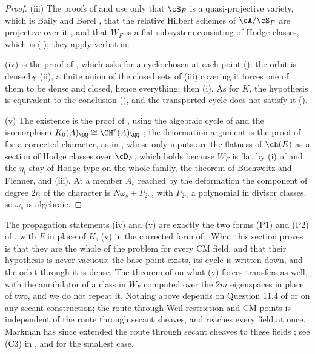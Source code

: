 \begin{proof}
(iii) The proofs of  and  use
only that $\cS_{F}$ is a quasi-projective variety, which is Baily and Borel
\cite{BB66}, that the relative Hilbert schemes of $\cA/\cS_{F}$ are
projective over it \cite{Gro61}, and that $W_{F}$ is a flat subsystem
consisting of Hodge classes, which is (i); they apply
verbatim.

(iv) is the proof of , which asks for a cycle chosen at
each point (): the orbit is dense by (ii), a finite
union of the closed sets of (iii) covering it forces one of them to be dense
and closed, hence everything; then (i). As for $K$, the hypothesis is
equivalent to the conclusion (), and the transported
cycle does not satisfy it ().

(v) The existence is the proof of , using the algebraic
cycle of  and the isomorphism
$K_{0}(A)_{\QQ}\cong\CH^{*}(A)_{\QQ}$ \cite{Ful98}; the deformation argument
is the proof of  for a corrected character, as in
, whose only inputs are the flatness of $\ch(E)$ as a
section of Hodge classes over $\cD_{F}$, which holds because $W_{F}$ is flat
by (i) of  and the $\eta_{t}$ stay of Hodge type on the
whole family, the theorem of Buchweitz and Flenner, and (iii). At a member
$A_{s}$ reached by the deformation the component of degree $2n$ of the
character is $N\omega_{s}+P_{2n}$, with $P_{2n}$ a polynomial in divisor
classes, so $\omega_{s}$ is algebraic.
\end{proof}

\begin{remark}\label{rem:cmwhatisnew}
The propagation statements (iv) and (v) are exactly the two forms (P1) and
(P2) of , with $F$ in place of $K$, (v) in the corrected
form of . What this section
proves is that they are the whole of the problem for every CM field, and
that their hypothesis is never vacuous: the base point exists, its cycle is
written down, and the orbit through it is dense. The theorem of
 on what (v) forces transfers as well, with the
annihilator of a class in $W_{F}$ computed over the $2m$ eigenspaces in place
of two, and we do not repeat it. Nothing above depends on Question 11.4 of
\cite{Mar25b} or on any secant construction; the route through Weil
restriction and CM points is independent of the route through secant sheaves,
and reaches every field at once. Markman has since extended the route through
secant sheaves to these fields \cite{Mar25c}; see (C3) in
, and  for the smallest case.
\end{remark}


